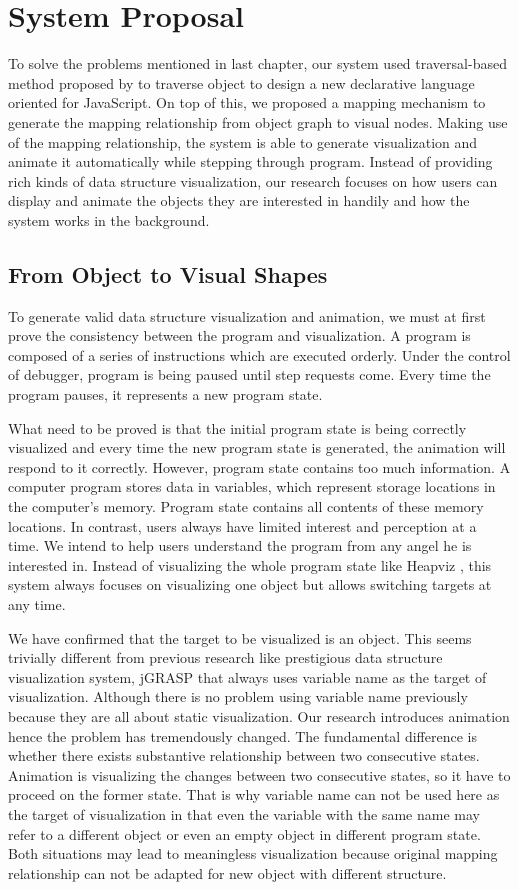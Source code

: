 \chapter {System Proposal}
To solve the problems mentioned in last chapter, our system used traversal-based method proposed by \cite{729554} to traverse object to design a new declarative language oriented for JavaScript. On top of this, we proposed a mapping mechanism to generate the mapping relationship from object graph to visual nodes. Making use of the mapping relationship, the system is able to generate visualization and animate it automatically while stepping through program. Instead of providing rich kinds of data structure visualization, our research focuses on how users can display and animate the objects they are interested in handily and how the system works in the background.

\section {From Object to Visual Shapes}
To generate valid data structure visualization and animation, we must at first prove the consistency between the program and visualization. A program is composed of a series of instructions which are executed orderly. Under the control of debugger, program is being paused until step requests come. Every time the program pauses, it represents a new program state. 

What need to be proved is that the initial program state is being correctly visualized and every time the new program state is generated, the animation will respond to it correctly. However, program state contains too much information. A computer program stores data in variables, which represent storage locations in the computer's memory. Program state contains all contents of these memory locations. In contrast, users always have limited interest and perception at a time. We intend to help users understand the program from any angel he is interested in. Instead of visualizing the whole program state like Heapviz \cite{Aftandilian:2010:HIH:1879211.1879222}, this system always focuses on visualizing one object but allows switching targets at any time. 

We have confirmed that the target to be visualized is an object. This seems trivially different from previous research like prestigious data structure visualization system, jGRASP \cite{Cross:2007:DOV:1227310.1227316} that always uses variable name as the target of visualization. Although there is no problem using variable name previously because they are all about static visualization. Our research introduces animation hence the problem has tremendously changed. The fundamental difference is whether there exists substantive relationship between two consecutive states. Animation is visualizing the changes between two consecutive states, so it have to proceed on the former state. That is why variable name can not be used here as the target of visualization in that even the variable with the same name may refer to a different object or even an empty object in different program state. Both situations may lead to meaningless visualization because original mapping relationship can not be adapted for new object with different structure.

